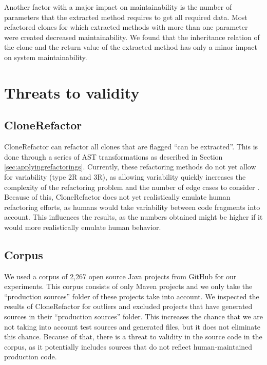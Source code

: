 Another factor with a major impact on maintainability is the number of parameters that the extracted method requires to get all required data. Most refactored clones for which extracted methods with more than one parameter were created decreased maintainability. We found that the inheritance relation of the clone and the return value of the extracted method has only a minor impact on system maintainability.

\section{Threats to validity}\label{chap:threatstovalidity}

\subsection{CloneRefactor}
CloneRefactor can refactor all clones that are flagged ``can be extracted''. This is done through a series of AST transformations as described in Section \ref{sec:applyingrefactorings}. Currently, these refactoring methods do not yet allow for variability (type 2R and 3R), as allowing variability quickly increases the complexity of the refactoring problem and the number of edge cases to consider \cite{tsantalis2015assessing}. Because of this, CloneRefactor does not yet realistically emulate human refactoring efforts, as humans would take variability between code fragments into account. This influences the results, as the numbers obtained might be higher if it would more realistically emulate human behavior.

\subsection{Corpus}
We used a corpus of 2,267 open source Java projects from GitHub for our experiments. This corpus consists of only Maven projects and we only take the ``production sources'' folder of these projects take into account. We inspected the results of CloneRefactor for outliers and excluded projects that have generated sources in their ``production sources'' folder. This increases the chance that we are not taking into account test sources and generated files, but it does not eliminate this chance. Because of that, there is a threat to validity in the source code in the corpus, as it potentially includes sources that do not reflect human-maintained production code.


